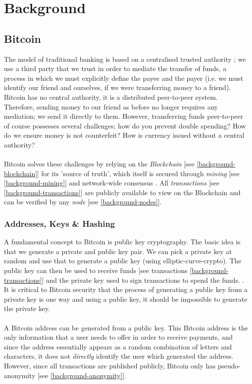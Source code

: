 \chapter{Background}

\section{Bitcoin}
The model of traditional banking is based on a centralised trusted authority \cite{RefWorks:doc:5c39e80ae4b0854ae611b047}; we use a third party that we trust in order to mediate the transfer of funds, a process in which we must explicitly define the payee and the payer (i.e. we must identify our friend and ourselves, if we were transferring money to a friend). Bitcoin has no central authority, it is a distributed peer-to-peer system. Therefore, sending money to our friend as before no longer requires any mediation; we send it directly to them. However, transferring funds peer-to-peer of course possesses several challenges; how do you prevent double spending? How do we ensure money is not counterfeit? \cite{RefWorks:doc:5c39e80ae4b0854ae611b047} How is currency issued without a central authority? 
\\\\
Bitcoin solves these challenges by relying on the \textit{Blockchain} [see \ref{background-blockchain}] for its 'source of truth', which itself is secured through \textit{mining} [see \ref{background-mining}] and network-wide consensus \cite{RefWorks:doc:5c39e80ae4b0854ae611b047}. All \textit{transactions} [see \ref{background-transactions}] are publicly available to view on the Blockchain and can be verified by any \textit{node} [see \ref{background-nodes}]. 

\subsection{Addresses, Keys \& Hashing}
A fundamental concept to Bitcoin is public key cryptography. The basic idea is that we generate a private and public key pair. We can pick a private key at random and use that to generate a public key (using \gls{elliptic-curve-crypto}). The public key can then be used to receive funds [see transactions \ref{background-transactions}] and the private key used to sign transactions to spend the funds. \cite{RefWorks:doc:5c39e80ae4b0854ae611b047}. It is critical to Bitcoin security that the process of generating a public key from a private key is one way and using a public key, it should be impossible to generate the private key. 
\\\\
A Bitcoin address can be generated from a public key. This Bitcoin address is the only information that a user needs to offer in order to receive payments, and since the address essentially appears as a random combination of letters and characters, it does not \textit{directly} identify the user which generated the address. However, since all transactions are published publicly, Bitcoin only has pseudo-anonymity [see \ref{background-anonymity}].

